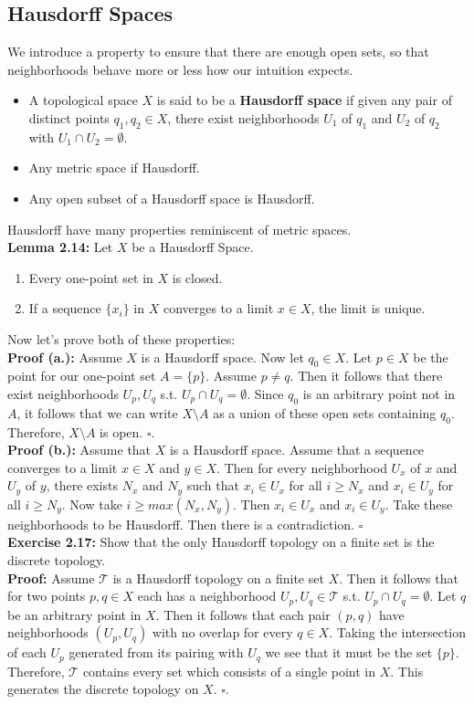 \documentclass{article}
\begin{document}
\subsection{Hausdorff Spaces}
We introduce a property to ensure that there are enough open sets, so that neighborhoods behave more or less how our intuition expects.
\begin{itemize}
    \item A topological space $X$ is said to be a \textbf{Hausdorff space} if given any pair of distinct points $q_1,q_2\in X$, there exist neighborhoods $U_1$ of $q_1$ and $U_2$ of $q_2$ with $U_1\cap U_2=\emptyset$.
    \item Any metric space if Hausdorff.
    \item Any open subset of a Hausdorff space is Hausdorff.
\end{itemize}
Hausdorff have many properties reminiscent of metric spaces.\\
\textbf{Lemma 2.14:} Let $X$ be a Hausdorff Space.
\begin{enumerate}[label=(\alph*.)]
    \item Every one-point set in $X$ is closed.
    \item If a sequence $\{x_i\}$ in $X$ converges to a limit $x\in X$, the limit is unique.
\end{enumerate}
Now let's prove both of these properties:\\
\textbf{Proof (a.):} Assume $X$ is a Hausdorff space. Now let $q_0\in X$. Let $p\in X$ be the point for our one-point set $A=\{p\}$. Assume $p\neq q$. Then it follows that there exist neighborhoods $U_p,U_q$ s.t. $U_p\cap U_q=\emptyset$. Since $q_0$ is an arbitrary point not in $A$, it follows that we can write $X\setminus A$ as a union of these open sets containing $q_0$. Therefore, $X\setminus A$ is open. $\square$.\\
\textbf{Proof (b.):} Assume that $X$ is a Hausdorff space. Assume that a sequence converges to a limit $x\in X$ and $y\in X$. Then for every neighborhood $U_x$ of $x$ and $U_y$ of $y$, there exists $N_x$ and $N_y$ such that $x_i\in U_x$ for all $i\geq N_x$ and $x_i\in U_y$ for all $i\geq N_y$. Now take $i\geq max(N_x, N_y)$. Then $x_i\in U_x$ and $x_i \in U_y$. Take these neighborhoods to be Hausdorff. Then there is a contradiction. $\square$\\
\textbf{Exercise 2.17:} Show that the only Hausdorff topology on a finite set is the discrete topology.\\
\textbf{Proof:} Assume $\mathcal{T}$ is a Hausdorff topology on a finite set $X$. Then it follows that for two points $p,q\in X$ each has a neighborhood $U_p,U_q\in\mathcal{T}$ s.t. $U_p\cap U_q=\emptyset$. Let $q$ be an arbitrary point in $X$. Then it follows that each pair $(p,q)$ have neighborhoods $(U_p,U_q)$ with no overlap for every $q\in X$. Taking the intersection of each $U_p$ generated from its pairing with $U_q$ we see that it must be the set $\{p\}$. Therefore, $\mathcal{T}$ contains every set which consists of a single point in $X$. This generates the discrete topology on $X$. $\square$.
\end{document}
